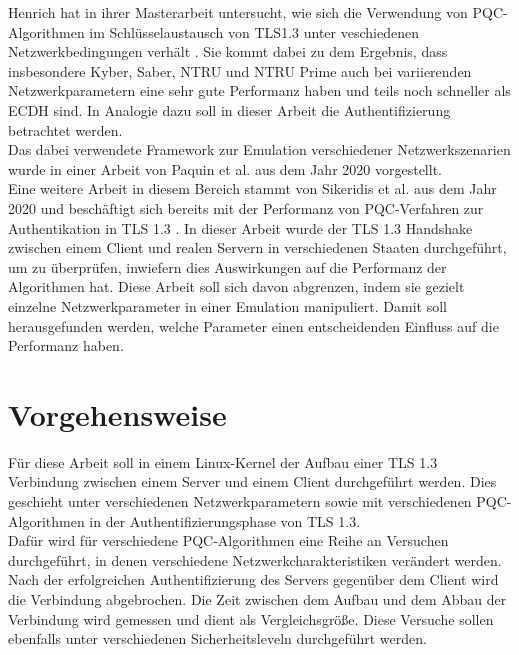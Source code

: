 	Henrich hat in ihrer Masterarbeit untersucht, wie sich die Verwendung von PQC-Algorithmen im Schlüsselaustausch von TLS1.3 unter veschiedenen Netzwerkbedingungen verhält \cite{Henrich2022}. Sie kommt dabei zu dem Ergebnis, dass insbesondere Kyber, Saber, NTRU und NTRU Prime auch bei variierenden Netzwerkparametern eine sehr gute Performanz haben und teils noch schneller als \ac{ECDH} sind. In Analogie dazu soll in dieser Arbeit die Authentifizierung betrachtet werden.\\
	
	Das dabei verwendete Framework zur Emulation verschiedener Netzwerkszenarien wurde in einer Arbeit von Paquin et al. aus dem Jahr 2020 \cite{Paquin2020} vorgestellt.\\
	
	Eine weitere Arbeit in diesem Bereich stammt von Sikeridis et al. aus dem Jahr 2020 und beschäftigt sich bereits mit der Performanz von PQC-Verfahren zur Authentikation in TLS 1.3 \cite{Sikeridis2020}. In dieser Arbeit wurde der TLS 1.3 Handshake zwischen einem Client und realen Servern in verschiedenen Staaten durchgeführt, um zu überprüfen, inwiefern dies Auswirkungen auf die Performanz der Algorithmen hat. Diese Arbeit soll sich davon abgrenzen, indem sie gezielt einzelne Netzwerkparameter in einer Emulation manipuliert. Damit soll herausgefunden werden, welche Parameter einen entscheidenden Einfluss auf die Performanz haben.\\

	\section{Vorgehensweise}
	\label{sec:einleitung:vorgehensweise}
	
	Für diese Arbeit soll in einem Linux-Kernel der Aufbau einer TLS 1.3 Verbindung zwischen einem Server und einem Client durchgeführt werden. Dies geschieht unter verschiedenen Netzwerkparametern sowie mit verschiedenen PQC-Algorithmen in der Authentifizierungsphase von TLS 1.3.\\
	
	Dafür wird für verschiedene PQC-Algorithmen eine Reihe an Versuchen durchgeführt, in denen verschiedene Netzwerkcharakteristiken verändert werden. Nach der erfolgreichen Authentifizierung des Servers gegenüber dem Client wird die Verbindung abgebrochen. Die Zeit zwischen dem Aufbau und dem Abbau der Verbindung wird gemessen und dient als Vergleichsgröße. Diese Versuche sollen ebenfalls unter verschiedenen Sicherheitsleveln durchgeführt werden.\\
	

